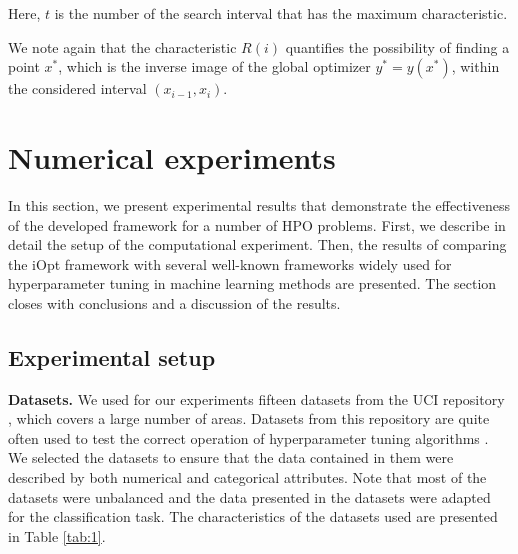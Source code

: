 \documentclass[preprint,12pt]{elsarticle}
\begin{document}
Here, $t$ is the number of the search interval that has the maximum characteristic.

We note again that the characteristic $R(i)$ quantifies the possibility of finding a point $x^*$, which is the inverse image of the global optimizer $y^* = y(x^*)$, within the considered interval $(x_{i-1},x_i)$.

\section{Numerical experiments}
\label{sec_exp}

In this section, we present experimental results that demonstrate the effectiveness of the developed framework for a number of HPO problems. First, we describe in detail the setup of the computational experiment. Then, the results of comparing the iOpt framework with several well-known frameworks widely used for hyperparameter tuning in machine learning methods are presented. The section closes with conclusions and a discussion of the results.

\subsection{Experimental setup}

\textbf{Datasets.} 
We used for our experiments fifteen datasets from the UCI repository \cite{UCI}, which covers a large number of areas. Datasets from this repository are quite often used to test the correct operation of hyperparameter tuning algorithms \cite{Joy2020,Wang2021,Wu2023}. We selected the datasets to ensure that the data contained in them were described by both numerical and categorical attributes. Note that most of the datasets were unbalanced and the data presented in the datasets were adapted for the classification task.  The characteristics of the datasets used are presented in Table \ref{tab:1}.
\end{document}
